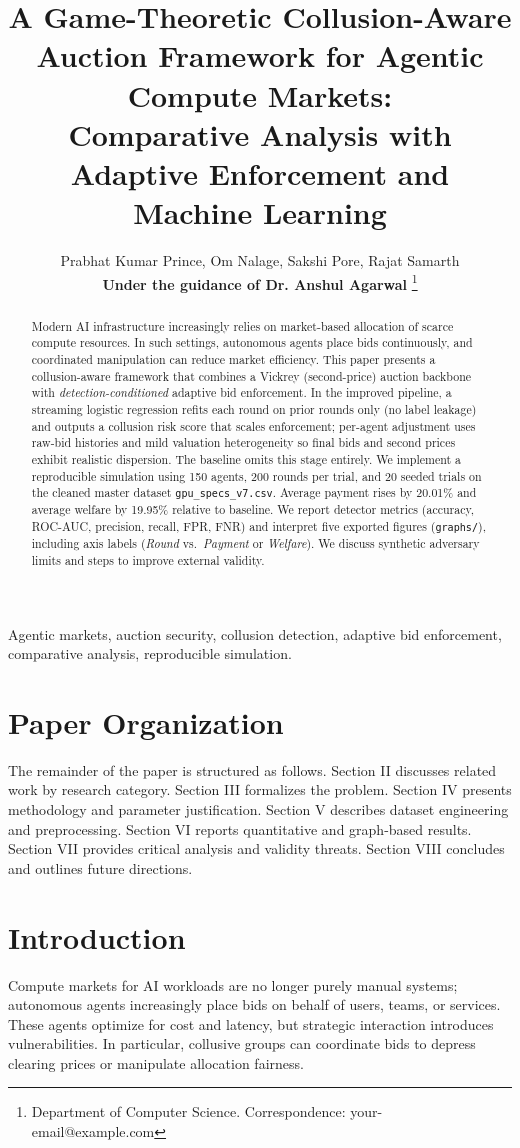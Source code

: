 \documentclass[journal]{IEEEtran}
\title{A Game-Theoretic Collusion-Aware Auction Framework for Agentic Compute Markets:\\
Comparative Analysis with Adaptive Enforcement and Machine Learning}
\author{
Prabhat Kumar Prince,
Om Nalage,
Sakshi Pore,
Rajat Samarth\\
\textbf{Under the guidance of Dr. Anshul Agarwal}
\thanks{Department of Computer Science. Correspondence: your-email@example.com}
}
\begin{document}
\maketitle

\begin{abstract}
Modern AI infrastructure increasingly relies on market-based allocation of scarce compute resources. In such settings, autonomous agents place bids continuously, and coordinated manipulation can reduce market efficiency. This paper presents a collusion-aware framework that combines a Vickrey (second-price) auction backbone with \emph{detection-conditioned} adaptive bid enforcement. In the improved pipeline, a streaming logistic regression refits each round on prior rounds only (no label leakage) and outputs a collusion risk score that scales enforcement; per-agent adjustment uses raw-bid histories and mild valuation heterogeneity so final bids and second prices exhibit realistic dispersion. The baseline omits this stage entirely. We implement a reproducible simulation using 150 agents, 200 rounds per trial, and 20 seeded trials on the cleaned master dataset \texttt{gpu\_specs\_v7.csv}. Average payment rises by 20.01\% and average welfare by 19.95\% relative to baseline. We report detector metrics (accuracy, ROC-AUC, precision, recall, FPR, FNR) and interpret five exported figures (\texttt{graphs/}), including axis labels (\emph{Round} vs.\ \emph{Payment} or \emph{Welfare}). We discuss synthetic adversary limits and steps to improve external validity.
\end{abstract}

\begin{IEEEkeywords}
Agentic markets, auction security, collusion detection, adaptive bid enforcement, comparative analysis, reproducible simulation.
\end{IEEEkeywords}

\section{Paper Organization}
The remainder of the paper is structured as follows. Section II discusses related work by research category. Section III formalizes the problem. Section IV presents methodology and parameter justification. Section V describes dataset engineering and preprocessing. Section VI reports quantitative and graph-based results. Section VII provides critical analysis and validity threats. Section VIII concludes and outlines future directions.

\section{Introduction}
Compute markets for AI workloads are no longer purely manual systems; autonomous agents increasingly place bids on behalf of users, teams, or services. These agents optimize for cost and latency, but strategic interaction introduces vulnerabilities. In particular, collusive groups can coordinate bids to depress clearing prices or manipulate allocation fairness.
\end{document}
